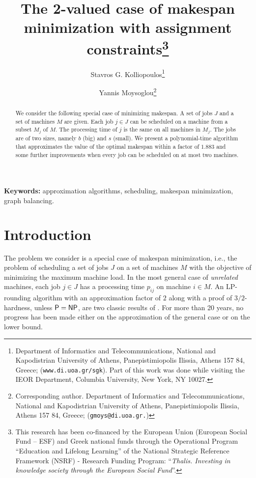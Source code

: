 \documentclass[11pt]{article}\usepackage{amsmath}
\date{}
\begin{document}
\title{The 2-valued case of makespan minimization with assignment constraints\thanks{This research has been co-financed by the European Union (European Social Fund -- ESF) and
Greek national funds through the Operational Program ``Education and Lifelong Learning'' of the
National Strategic Reference Framework (NSRF) - Research Funding Program:
``{\sl Thalis. Investing in knowledge society through the European Social Fund}''.}}
\author {Stavros G. Kolliopoulos\thanks{Department of Informatics and
Telecommunications, National and Kapodistrian 
University of Athens, Panepistimiopolis Ilissia, Athens
157 84, Greece; (\texttt{www.di.uoa.gr/}\~{\tt sgk}). Part of this
work was done while visiting the 
  IEOR Department, Columbia University, New York, NY 10027.}   
\and Yannis Moysoglou\thanks{ Corresponding author. Department of Informatics and
Telecommunications, National and Kapodistrian 
University of Athens, Panepistimiopolis Ilissia, Athens
157 84, Greece; (\texttt{gmoys@di.uoa.gr.}) } }
\maketitle



\begin{abstract}
We consider  the following   special case of minimizing makespan.  
A set of jobs $J$ 
and a set of machines $M$ are given. Each job $j \in J$ can be
scheduled on a  machine
from a subset $M_j$ of $M$. The processing time of $j$ is the same on
all  machines in $M_j.$ The jobs  are of two sizes, namely $b$ (big) and
$s$ (small). We present  a polynomial-time  algorithm that
approximates the value of the optimal makespan  within a 
factor of $1.883$ and some further improvements  when every job
can be scheduled on at most two machines. 
\end{abstract} 

{\bf Keywords:} approximation algorithms, scheduling, 
makespan minimization, graph balancing. 


\section{Introduction}


 The problem we  consider is a special case  of makespan minimization,
 i.e., the problem  of scheduling a set of jobs $J$ on a set of
 machines  
$M$ with the objective
 of  minimizing the  maximum machine load.  In the  most
 general case  of \emph{unrelated} machines,  each job $j \in J$ has a
 processing  time  $p_{ij}$  on  machine  $i \in M.$  An  LP-rounding
 algorithm with an  approximation factor of $2$ along  with a proof of
 $3/2$-hardness, unless ${\sf P} = {\sf
  NP}$, are two
 classic results of \cite{lenstra}. For more than 20 years, 
no progress has
 been made either  on the approximation of the general  case or on the
 lower bound.
\end{document}
